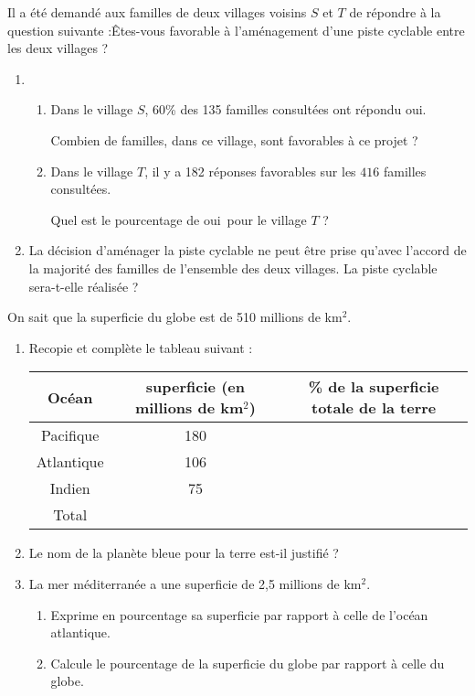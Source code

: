 \documentclass[10pt]{article}
\begin{document}
{\begin{Exo}
Il a été demandé aux familles de deux villages voisins $S$ et $T$ de
répondre à la question suivante :\og \^Etes-vous favorable à
l'aménagement d'une piste cyclable entre les deux villages ?\fg
\begin{enumerate}
\item
\begin{enumerate}
\item Dans le village $S$, 60\% des 135 familles consultées ont
répondu \og oui\fg.\par Combien de familles, dans ce village, sont
favorables à ce projet ?
\item Dans le village $T$, il y a 182 réponses favorables sur les
$416$ familles consultées.\par Quel est le pourcentage de \og oui\fg\
pour le village $T$ ?
\end{enumerate}
\item La décision d'aménager la piste cyclable ne peut être prise
qu'avec l'accord de la majorité des familles de l'ensemble des deux
villages. La piste cyclable sera-t-elle réalisée ?
\end{enumerate}
\end{Exo}

\begin{Exo}
On sait que la superficie du globe est de 510 millions de km$^2$.
\begin{enumerate}
\item Recopie et complète le tableau suivant :
\\\begin{tabular}[c]{|c|c|c|}
 \hline Océan & superficie (en millions de km$^2$) & \% de la 
 superficie totale de la terre \\  
 \hline Pacifique & 180 &  \\  
 \hline Atlantique & 106 & \\
 \hline Indien & 75 &  \\
 \hline Total & & \\
 \hline 
\end{tabular}
 \item Le nom de la planète bleue pour la terre est-il justifié ?
 \item La mer méditerranée a une superficie de 2,5 millions de km$^2$.
   \begin{enumerate}
      \item Exprime en pourcentage sa superficie par rapport à celle 
      de l'océan atlantique.
      \item Calcule le pourcentage de la superficie du globe par rapport 
      à celle du globe.    
    \end{enumerate}  
\end{enumerate}
\end{Exo}

}
\end{document}
